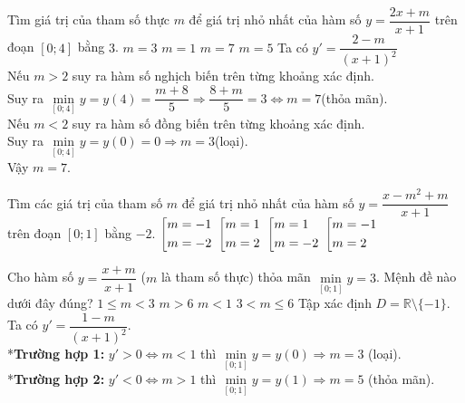 \begin{ex}%
	Tìm giá trị của tham số thực $m$ để giá trị nhỏ nhất của hàm số $y=\dfrac{2x+m}{x+1}$ trên đoạn $[0;4]$ bằng $3$.
	\choice
	{$m=3$}
	{$m=1$}
	{\True $m=7$}
	{$m=5$}
	\loigiai
	{Ta có $y'=\dfrac{2-m}{(x+1)^2}$\\
	Nếu $m > 2$ suy ra hàm số nghịch biến trên từng khoảng xác định.\\
	Suy ra $\min\limits_{[0;4]} y=y(4)=\dfrac{m+8}{5} \Rightarrow \dfrac{8+m}{5}=3 \Leftrightarrow m=7$(thỏa mãn).\\
	Nếu $m<2$ suy ra hàm số đồng biến trên từng khoảng xác định.\\
	Suy ra $\min\limits_{[0;4]} y=y(0)=0 \Rightarrow m=3$(loại).\\ Vậy $m=7$.
	}
\end{ex}
\begin{ex}%
	Tìm các giá trị của tham số $m$ để giá trị nhỏ nhất của hàm số $y=\dfrac{x-m^2+m}{x+1}$ trên đoạn $[0;1]$ bằng $-2$.
	\choice
	{$\left[\begin{aligned}&m=-1\\&m=-2\end{aligned}\right.$}
	{$\left[\begin{aligned}&m=1\\&m=2\end{aligned}\right.$}
	{$\left[\begin{aligned}&m=1\\&m=-2\end{aligned}\right.$}
	{\True $\left[\begin{aligned}&m=-1\\&m=2\end{aligned}\right.$}
\end{ex}
\begin{ex}%
	Cho hàm số $y=\dfrac{x+m}{x+1}$ ($m$ là tham số thực) thỏa mãn $\min\limits_{[0;1]} y=3$. Mệnh đề nào dưới đây đúng?
	\choice
	{$1 \leq m<3$}
	{$m>6$}
	{$m<1$}
	{\True $3<m\leq 6$}
	\loigiai
	{Tập xác định $D = \mathbb{R}\setminus \{-1\}$.\\
	Ta có $y'=\dfrac{1-m}{(x+1)^2}$.\\
	*\textbf{Trường hợp 1:} $y'>0 \Leftrightarrow m < 1$ thì $\min\limits_{[0;1]} y=y(0) \Rightarrow m=3$ (loại).\\
	*\textbf{Trường hợp 2:}  $y'<0  \Leftrightarrow m>1$ thì $\min\limits_{[0;1]} y=y(1) \Rightarrow m=5$ (thỏa mãn).
}
\end{ex}
